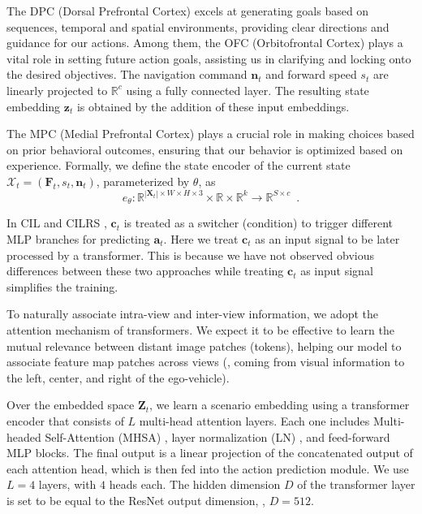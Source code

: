 The DPC (Dorsal Prefrontal Cortex) excels at generating goals based on sequences, temporal and spatial environments, providing clear directions and guidance for our actions.
Among them, the OFC (Orbitofrontal Cortex) plays a vital role in setting future action goals, assisting us in clarifying and locking onto the desired objectives. 
The navigation command $\mathbf{n}_t$ and forward speed $s_t$ are linearly projected to $\mathbb{R}^{c}$ using a fully connected layer.
The resulting state embedding $\mathbf{z}_t$ is obtained by the addition of these input embeddings. 


The MPC (Medial Prefrontal Cortex) plays a crucial role in making choices based on prior behavioral outcomes, ensuring that our behavior is optimized based on experience.
Formally, we define the state encoder of the current state $\mathcal{X}_t=(\mathbf{F}_t, s_t, \mathbf{n}_t)$, parameterized by $\theta$, as
\begin{equation}\label{eq:encoder}
	e_{\theta}: \mathbb{R}^{|\mathbf{X}_{t}|\times W\times H\times3}\times\mathbb{R}\times \mathbb{R}^k \rightarrow \mathbb{R}^{S \times c} \enspace .
\end{equation}


In CIL \cite{Codevilla:2018} and CILRS \cite{Codevilla:2019}, $\mathbf{c}_{t}$ is treated as a switcher (condition) to trigger different MLP branches for predicting $\mathbf{a}_{t}$. 
Here we treat $\mathbf{c}_{t}$ as an input signal to be later processed by a transformer. 
This is because we have not observed obvious differences between these two approaches while treating $\mathbf{c}_{t}$ as input signal simplifies the training. 


To naturally associate intra-view and inter-view information, we adopt the attention mechanism of transformers\cite{Vaswani:2017}. 
We expect it to be effective to learn the mutual relevance between distant image patches (tokens), helping our model to associate feature map patches across views ({\ie}, coming from visual information to the left, center, and right of the ego-vehicle). 


Over the embedded space $\mathbf{Z}_{t}$, we learn a scenario embedding using a transformer encoder that consists of $L$ multi-head attention layers. 
Each one includes Multi-headed Self-Attention (MHSA) \cite{Vaswani:2017}, layer normalization (LN) \cite{Ba:2016}, and feed-forward MLP blocks.  
The final output is a linear projection of the concatenated output of each attention head, which is then fed into the action prediction module. 
We use $L=4$ layers, with $4$ heads each. 
The hidden dimension $D$ of the transformer layer is set to be equal to the ResNet output dimension, {\ie}, $D=512$. 


